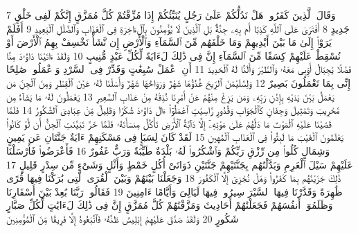 {\tiny\colorbox{cl_aya}{7}} وَقَالَ ٱلَّذِينَ كَفَرُوا۟ هَلْ نَدُلُّكُمْ عَلَىٰ رَجُلٍ يُنَبِّئُكُمْ إِذَا مُزِّقْتُمْ كُلَّ مُمَزَّقٍ إِنَّكُمْ لَفِى خَلْقٍ جَدِيدٍ
{\tiny\colorbox{cl_aya}{8}} أَفْتَرَىٰ عَلَى ٱللَّهِ كَذِبًا أَم بِهِۦ جِنَّةٌۢ بَلِ ٱلَّذِينَ لَا يُؤْمِنُونَ بِٱلْءَاخِرَةِ فِى ٱلْعَذَابِ وَٱلضَّلَٰلِ ٱلْبَعِيدِ
{\tiny\colorbox{cl_aya}{9}} أَفَلَمْ يَرَوْا۟ إِلَىٰ مَا بَيْنَ أَيْدِيهِمْ وَمَا خَلْفَهُم مِّنَ ٱلسَّمَآءِ وَٱلْأَرْضِ إِن نَّشَأْ نَخْسِفْ بِهِمُ ٱلْأَرْضَ أَوْ نُسْقِطْ عَلَيْهِمْ كِسَفًا مِّنَ ٱلسَّمَآءِ إِنَّ فِى ذَٰلِكَ لَءَايَةً لِّكُلِّ عَبْدٍ مُّنِيبٍ
{\tiny\colorbox{cl_aya}{10}} وَلَقَدْ ءَاتَيْنَا دَاوُۥدَ مِنَّا فَضْلًا يَٰجِبَالُ أَوِّبِى مَعَهُۥ وَٱلطَّيْرَ وَأَلَنَّا لَهُ ٱلْحَدِيدَ
{\tiny\colorbox{cl_aya}{11}} أَنِ ٱعْمَلْ سَٰبِغَٰتٍ وَقَدِّرْ فِى ٱلسَّرْدِ وَٱعْمَلُوا۟ صَٰلِحًا إِنِّى بِمَا تَعْمَلُونَ بَصِيرٌ
{\tiny\colorbox{cl_aya}{12}} وَلِسُلَيْمَٰنَ ٱلرِّيحَ غُدُوُّهَا شَهْرٌ وَرَوَاحُهَا شَهْرٌ وَأَسَلْنَا لَهُۥ عَيْنَ ٱلْقِطْرِ وَمِنَ ٱلْجِنِّ مَن يَعْمَلُ بَيْنَ يَدَيْهِ بِإِذْنِ رَبِّهِۦ وَمَن يَزِغْ مِنْهُمْ عَنْ أَمْرِنَا نُذِقْهُ مِنْ عَذَابِ ٱلسَّعِيرِ
{\tiny\colorbox{cl_aya}{13}} يَعْمَلُونَ لَهُۥ مَا يَشَآءُ مِن مَّحَٰرِيبَ وَتَمَٰثِيلَ وَجِفَانٍ كَٱلْجَوَابِ وَقُدُورٍ رَّاسِيَٰتٍ ٱعْمَلُوٓا۟ ءَالَ دَاوُۥدَ شُكْرًا وَقَلِيلٌ مِّنْ عِبَادِىَ ٱلشَّكُورُ
{\tiny\colorbox{cl_aya}{14}} فَلَمَّا قَضَيْنَا عَلَيْهِ ٱلْمَوْتَ مَا دَلَّهُمْ عَلَىٰ مَوْتِهِۦٓ إِلَّا دَآبَّةُ ٱلْأَرْضِ تَأْكُلُ مِنسَأَتَهُۥ فَلَمَّا خَرَّ تَبَيَّنَتِ ٱلْجِنُّ أَن لَّوْ كَانُوا۟ يَعْلَمُونَ ٱلْغَيْبَ مَا لَبِثُوا۟ فِى ٱلْعَذَابِ ٱلْمُهِينِ
{\tiny\colorbox{cl_aya}{15}} لَقَدْ كَانَ لِسَبَإٍ فِى مَسْكَنِهِمْ ءَايَةٌ جَنَّتَانِ عَن يَمِينٍ وَشِمَالٍ كُلُوا۟ مِن رِّزْقِ رَبِّكُمْ وَٱشْكُرُوا۟ لَهُۥ بَلْدَةٌ طَيِّبَةٌ وَرَبٌّ غَفُورٌ
{\tiny\colorbox{cl_aya}{16}} فَأَعْرَضُوا۟ فَأَرْسَلْنَا عَلَيْهِمْ سَيْلَ ٱلْعَرِمِ وَبَدَّلْنَٰهُم بِجَنَّتَيْهِمْ جَنَّتَيْنِ ذَوَاتَىْ أُكُلٍ خَمْطٍ وَأَثْلٍ وَشَىْءٍ مِّن سِدْرٍ قَلِيلٍ
{\tiny\colorbox{cl_aya}{17}} ذَٰلِكَ جَزَيْنَٰهُم بِمَا كَفَرُوا۟ وَهَلْ نُجَٰزِىٓ إِلَّا ٱلْكَفُورَ
{\tiny\colorbox{cl_aya}{18}} وَجَعَلْنَا بَيْنَهُمْ وَبَيْنَ ٱلْقُرَى ٱلَّتِى بَٰرَكْنَا فِيهَا قُرًى ظَٰهِرَةً وَقَدَّرْنَا فِيهَا ٱلسَّيْرَ سِيرُوا۟ فِيهَا لَيَالِىَ وَأَيَّامًا ءَامِنِينَ
{\tiny\colorbox{cl_aya}{19}} فَقَالُوا۟ رَبَّنَا بَٰعِدْ بَيْنَ أَسْفَارِنَا وَظَلَمُوٓا۟ أَنفُسَهُمْ فَجَعَلْنَٰهُمْ أَحَادِيثَ وَمَزَّقْنَٰهُمْ كُلَّ مُمَزَّقٍ إِنَّ فِى ذَٰلِكَ لَءَايَٰتٍ لِّكُلِّ صَبَّارٍ شَكُورٍ
{\tiny\colorbox{cl_aya}{20}} وَلَقَدْ صَدَّقَ عَلَيْهِمْ إِبْلِيسُ ظَنَّهُۥ فَٱتَّبَعُوهُ إِلَّا فَرِيقًا مِّنَ ٱلْمُؤْمِنِينَ
